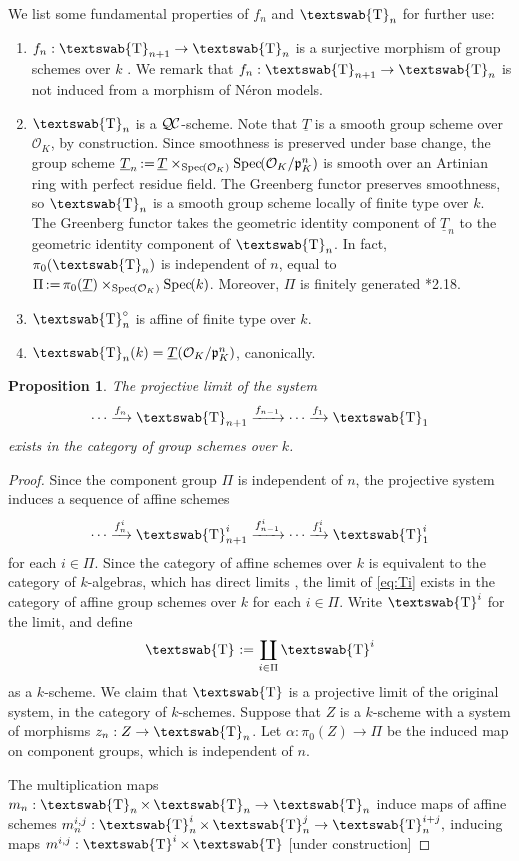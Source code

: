 \documentclass{amsart}
\makeatletter
\theoremstyle{plain}
\newtheorem{proposition}[theorem]{Proposition}
\theoremstyle{definition}
\theoremstyle{remark}
\newcommand{\OK}{\mathcal{O}_K}
\newcommand{\pK}{\mathfrak{p}_K}
\newcommand{\Fq}{k}
\newcommand{\comp}{\Pi} %
\newcommand{\mathswab}[1]{\operatorname{\textswab{#1}}}
\newcommand{\GN}[1]{\mathswab{#1}}
\newcommand{\TT}{\underline{T}}
\newcommand{\Spec}[1]{{\operatorname{Spec}\hskip-1pt( #1 )}}
\newcommand{\ceq}{{\, :=\, }}
\newcommand{\QC}{{\mathcal{Q\hskip-0.8pt C}}}
\newcommand{\labitem}[2]{
\def\@itemlabel{\textbf{#1}}
\item
\def\@currentlabel{#1}\label{#2}}
\makeatother
\begin{document}
We list some fundamental properties of $f_n$ and $\GN{T}_n$ for further use:
 \begin{enumerate}
  \labitem{(GN.0)}{truncation}
  $f_n : \GN{T}_{n+1} \to \GN{T}_n$ is a surjective morphism of group schemes over $\Fq$
  .
  We remark that $f_n : \GN{T}_{n+1} \to \GN{T}_n$ is not induced from a morphism of Néron models.
  \labitem{(GN.1)}{smooth}
  $\GN{T}_n$ is a $\QC$-scheme.
  Note that $\underline{T}$ is a smooth group scheme over $\OK$, by construction.
  Since smoothness is preserved under base change, the group scheme
  $\TT_n \ceq \underline{T} \times_\Spec{\OK} \Spec{\OK/\pK^n}$
  is smooth over an Artinian ring with perfect residue field.
  The Greenberg functor preserves smoothness,
  so $\GN{T}_n$ is a smooth group scheme locally of finite type over $\Fq$.
  The Greenberg functor takes the geometric identity component of $\TT_n$
  to the geometric identity component of $\GN{T}_n$.
  In fact, $\pi_0(\GN{T}_n)$ is independent of $n$, equal to $\comp \ceq \pi_0(\TT) \times_{\Spec{\OK}} \Spec{\Fq}$.
  Moreover, $\Pi$ is finitely generated \cite{xarles:93a}*{2.18}.
  \labitem{(GN.2)}{identity} $\GN{T}_n^\circ$ is affine of finite type over $\Fq$.
  \labitem{(GN.3)}{points} $\GN{T}_n(\Fq) = \TT(\OK/\pK^n)$, canonically.
\end{enumerate}

\begin{proposition}
The projective limit of the system
\[
\cdots \xrightarrow{f_n} \GN{T}_{n+1} \xrightarrow{f_{n-1}} \cdots \xrightarrow{f_1} \GN{T}_1
\]
exists in the category of group schemes over $\Fq$.
\end{proposition}
\begin{proof}
Since the component group $\comp$ is independent of $n$, the projective system induces a sequence of affine schemes
\begin{equation} \label{eq:Ti}
\cdots \xrightarrow{f^i_n} \GN{T}^i_{n+1} \xrightarrow{f^i_{n-1}} \cdots \xrightarrow{f^i_1} \GN{T}^i_1
\end{equation}
for each $i \in \comp$.
Since the category of affine schemes over $k$ is equivalent to the category of $k$-algebras, which has direct limits ,
the limit of \eqref{eq:Ti} exists in the category of affine group schemes over $k$ for each $i \in \comp$.  Write $\GN{T}^i$ for the limit,
and define
\[
\GN{T} \ceq \coprod_{i \in \comp} \GN{T}^i
\]
as a $k$-scheme.  We claim that $\GN{T}$ is a projective limit of the original system, in the category of $k$-schemes.  Suppose that $Z$ is a $k$-scheme
with a system of morphisms $z_n : Z \to \GN{T}_n$.  Let $\alpha : \pi_0(Z) \to \comp$ be the induced map on component groups, which is
independent of $n$.  


The multiplication maps $m_n : \GN{T}_n \times \GN{T}_n \to \GN{T}_n$ induce maps of affine schemes
$m_n^{i,j} : \GN{T}_n^i \times \GN{T}_n^j \to \GN{T}_n^{i+j},$ inducing maps $m^{i,j} : \GN{T}^i \times \GN{T}$ [under construction]
\end{proof}
\end{document}
